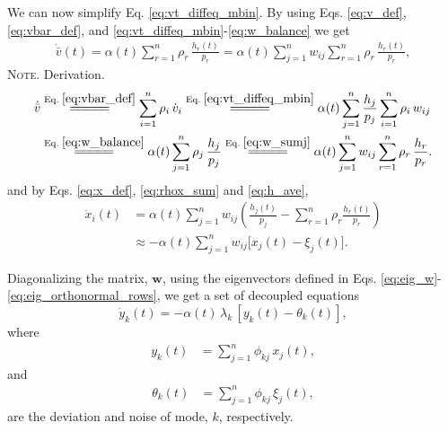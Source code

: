 \documentclass[reprint, superscriptaddress, floatfix]{revtex4-1}
\newcommand{\note}[1]{{\color{DarkGreen}\footnotesize \textsc{Note.} #1}}
\begin{document}
We can now simplify Eq. \eqref{eq:vt_diffeq_mbin}.
%
By using Eqs.
\eqref{eq:v_def}, \eqref{eq:vbar_def}, and
\eqref{eq:vt_diffeq_mbin}-\eqref{eq:w_balance}
we get
%
\begin{align*}
  \dot{ \bar v }(t)
  =
  \alpha(t)
  \sum_{r = 1}^n \rho_r
    \, \frac{ h_r(t) } { p_r }
  =
  \alpha(t)
  \sum_{j = 1}^n w_{ij}
  \sum_{r = 1}^n \rho_r
    \, \frac{ h_r(t) } { p_r }
  ,
\end{align*}
%
\note{Derivation.
$$\begin{aligned}
  \dot{ \bar v }
  &
  \stackrel{\mathrm{Eq.\; \eqref{eq:vbar_def}}}
  {=\joinrel=\joinrel=\joinrel=\joinrel=}
  \sum_{i = 1}^n \rho_i \, \dot v_i
  \stackrel{\mathrm{Eq.\; \eqref{eq:vt_diffeq_mbin}}}
  {=\joinrel=\joinrel=\joinrel=\joinrel=}
  \alpha(t)
  \sum_{j = 1}^n \frac{ h_j } { p_j }
                 \sum_{ i = 1 }^{n} \rho_i \, w_{ij}
  \\
  &
  \stackrel{\mathrm{Eq.\; \eqref{eq:w_balance}}}
  {=\joinrel=\joinrel=\joinrel=\joinrel=}
  \alpha(t)
  \sum_{j = 1}^n \rho_j
    \, \frac{ h_j } { p_j }
  \stackrel{\mathrm{Eq.\; \eqref{eq:w_sumj}}}
  {=\joinrel=\joinrel=\joinrel=\joinrel=}
  \alpha(t)
  \sum_{j = 1}^n w_{ij}
  \sum_{r = 1}^n \rho_r
    \, \frac{ h_r } { p_r }
  .
\end{aligned}$$
}
%
and by Eqs. \eqref{eq:x_def}, \eqref{eq:rhox_sum} and \eqref{eq:h_ave},
%
$$
\begin{aligned}
  \dot x_i(t)
  &= \alpha(t) \sum_{j=1}^n w_{ij}
  \left(
    \frac{ h_j(t) } { p_j }
    -
    \sum_{r = 1}^n
      \rho_r \frac{ h_r(t) } { p_r }
  \right)
  \\
  &\approx
  -\alpha(t) \sum_{j = 1}^n
  w_{ij} \bigl[ x_j(t) - \xi_j (t) \bigr]
  .
\end{aligned}
$$

Diagonalizing the matrix, $\mathbf w$,
using the eigenvectors defined in Eqs.
\eqref{eq:eig_w}-\eqref{eq:eig_orthonormal_rows},
we get a set of decoupled equations
%
\begin{equation}
  \dot y_k(t)
  =
  -\alpha(t) \, \lambda_k \, [y_k(t) - \theta_k(t)],
\label{eq:yt_diffeq}
\end{equation}
%
where
\begin{align}
  y_k(t)
  &=
  \sum_{j=1}^n
    \phi_{kj} \, x_j(t)
  ,
  \label{eq:y_def}
\end{align}
and
\begin{align}
  \theta_k(t)
  &=
  \sum_{j=1}^n
    \phi_{kj} \, \xi_j(t)
  ,
  \label{eq:theta_def}
\end{align}
are the deviation and noise of mode, $k$, respectively.
\end{document}
